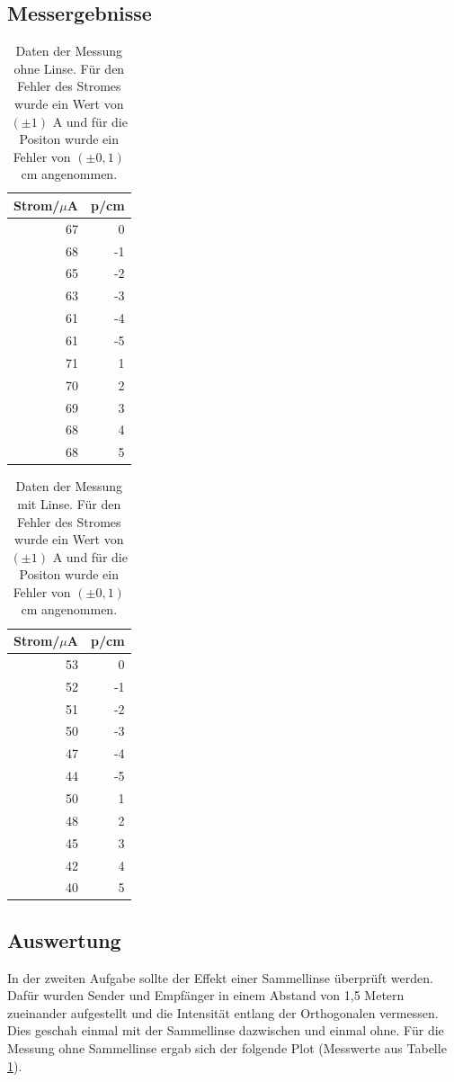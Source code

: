 \documentclass[12pt]{scrartcl}
\begin{document}
\subsection{Messergebnisse}
\begin{table}[H]
\caption{Daten der Messung ohne Linse. Für den Fehler des Stromes wurde ein Wert von $(\pm 1)$ A und für die Positon wurde ein Fehler von $(\pm 0,1)$ cm angenommen.}
\centering
\begin{tabular}{|r|r|}
\hline
\multicolumn{1}{|l|}{Strom/$\mu$A} & \multicolumn{1}{l|}{p/cm} \\ \hline
67 & 0 \\ \hline
68 & -1 \\ \hline
65 & -2 \\ \hline
63 & -3 \\ \hline
61 & -4 \\ \hline
61 & -5 \\ \hline
71 & 1 \\ \hline
70 & 2 \\ \hline
69 & 3 \\ \hline
68 & 4 \\ \hline
68 & 5 \\ \hline
\end{tabular}
\label{tab:a_2_o}
\end{table}

\begin{table}[H]
\caption{Daten der Messung mit Linse. Für den Fehler des Stromes wurde ein Wert von $(\pm 1)$ A und für die Positon wurde ein Fehler von $(\pm 0,1)$ cm angenommen.}
\centering
\begin{tabular}{|r|r|}
\hline
\multicolumn{1}{|l|}{Strom/$\mu$A} & \multicolumn{1}{l|}{p/cm} \\ \hline
53 & 0 \\ \hline
52 & -1 \\ \hline
51 & -2 \\ \hline
50 & -3 \\ \hline
47 & -4 \\ \hline
44 & -5 \\ \hline
50 & 1 \\ \hline
48 & 2 \\ \hline
45 & 3 \\ \hline
42 & 4 \\ \hline
40 & 5 \\ \hline
\end{tabular}
\label{tab:a_2_m}
\end{table}
\subsection{Auswertung}
In der zweiten Aufgabe sollte der Effekt einer Sammellinse überprüft werden.
Dafür wurden Sender und Empfänger in einem Abstand von 1,5 Metern zueinander aufgestellt und die Intensität entlang der Orthogonalen vermessen. Dies geschah einmal mit der Sammellinse dazwischen und einmal ohne. Für die Messung ohne Sammellinse ergab sich der folgende Plot (Messwerte aus Tabelle \ref{tab:a_2_o}).
\end{document}
